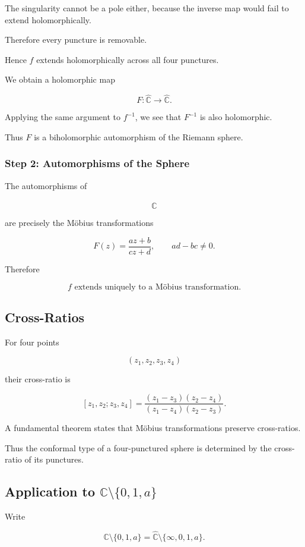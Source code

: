 \documentclass[12pt,a4paper]{article}
\theoremstyle{notespace}
\begin{document}
The singularity cannot be a pole either, because the inverse map would fail to extend holomorphically.

Therefore every puncture is removable.

Hence \(f\) extends holomorphically across all four punctures.

We obtain a holomorphic map

\[
F:\widehat{\mathbb C}\to\widehat{\mathbb C}.
\]

Applying the same argument to \(f^{-1}\), we see that \(F^{-1}\) is also holomorphic.

Thus \(F\) is a biholomorphic automorphism of the Riemann sphere.

\subsubsection*{Step 2: Automorphisms of the Sphere}

The automorphisms of

\[
\widehat{\mathbb C}
\]

are precisely the Möbius transformations

\[
F(z)
=
\frac{az+b}{cz+d},
\qquad
ad-bc\neq0.
\]

Therefore

\[
\boxed{
	f
	\text{ extends uniquely to a Möbius transformation.}
}
\]

\subsection*{Cross-Ratios}

For four points

\[
(z_1,z_2,z_3,z_4)
\]

their cross-ratio is

\[
[z_1,z_2;z_3,z_4]
=
\frac{(z_1-z_3)(z_2-z_4)}
{(z_1-z_4)(z_2-z_3)}.
\]

A fundamental theorem states that Möbius transformations preserve cross-ratios.

Thus the conformal type of a four-punctured sphere is determined by the cross-ratio of its punctures.

\subsection*{Application to \(\mathbb C\setminus\{0,1,a\}\)}

Write

\[
\mathbb C\setminus\{0,1,a\}
=
\widehat{\mathbb C}
\setminus
\{\infty,0,1,a\}.
\]
\end{document}
